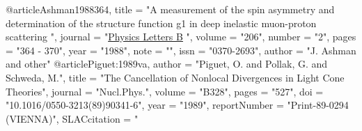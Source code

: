 @article{Ashman1988364,
title = "A measurement of the spin asymmetry and determination of the structure function g1 in deep inelastic muon-proton scattering ",
journal = "\href{http://www.sciencedirect.com/science/article/pii/0370269388915237}{Physics Letters B} ",
volume = "206",
number = "2",
pages = "364 - 370",
year = "1988",
note = "",
issn = "0370-2693",
author = "J. Ashman and other"
}
@article{Piguet:1989va,
      author         = "Piguet, O. and Pollak, G. and Schweda, M.",
      title          = "{The Cancellation of Nonlocal Divergences in Light Cone Theories}",
      journal        = "Nucl.Phys.",
      volume         = "B328",
      pages          = "527",
      doi            = "10.1016/0550-3213(89)90341-6",
      year           = "1989",
      reportNumber   = "Print-89-0294 (VIENNA)",
      SLACcitation   = "%
}
	

